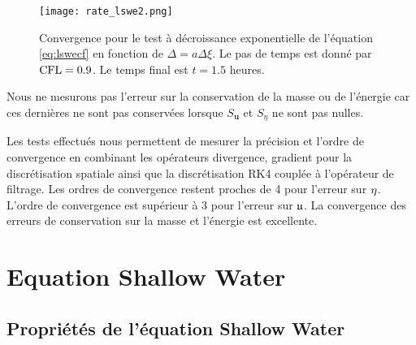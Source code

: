 \begin{figure}[htbp]
\begin{center}
\texttt{[image: rate\_lswe2.png]}
\end{center}
\caption{Convergence pour le test à décroissance exponentielle de l'équation \eqref{eq:lswecf} en fonction de $\Delta = a \Delta \xi$. Le pas de temps est donné par $\text{CFL}=0.9$. Le temps final est $t=1.5$ heures.}
\label{fig:rate_lswe2}
\end{figure}

Nous ne mesurons pas l'erreur sur la conservation de la masse ou de l'énergie car ces dernières ne sont pas conservées lorsque $S_{\mathbf{u}}$ et $S_{\eta}$ ne sont pas nulles.

Les tests effectués nous permettent de mesurer la précision et l'ordre de convergence en combinant les opérateurs divergence, gradient pour la discrétisation spatiale ainsi que la discrétisation RK4 couplée à l'opérateur de filtrage. Les ordres de convergence restent proches de 4 pour l'erreur sur $\mathbf{\eta}$. L'ordre de convergence est supérieur à 3 pour l'erreur sur $\mathfrak{u}$. La convergence des erreurs de conservation sur la masse et l'énergie est excellente.



























\section{Equation Shallow Water}

\subsection{Propriétés de l'équation Shallow Water}

